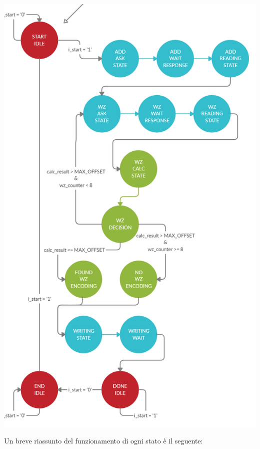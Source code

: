 \documentclass[12pt,a4paper,titlepage]{article}
\begin{document}
		\begin{center}
			\includegraphics[scale=0.275]{retlog_FSM_v1_4.png}
		\end{center}
		
		Un breve riassunto del funzionamento di ogni stato è il seguente:
		
\end{document}
